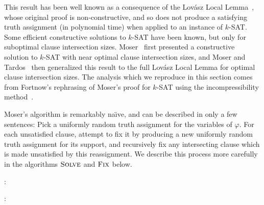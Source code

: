 \documentclass{patmorin}
\begin{document}
This result has been well known as a consequence of the Lov\'{a}sz
Local Lemma~\cite{lovasz:locallemma}, whose original proof is
non-constructive, and so does not produce a satisfying truth
assignment (in polynomial time) when applied to an instance of
$k$-SAT. Some efficient constructive solutions to $k$-SAT have been
known, but only for suboptimal clause intersection sizes.
Moser~\cite{moser:ksat} first presented a constructive solution to
$k$-SAT with near optimal clause intersection sizes, and Moser and
Tardos~\cite{moser:locallemma} then generalized this result to the
full Lov\'{a}sz Local Lemma for optimal clause intersection sizes. The
analysis which we reproduce in this section comes from Fortnow's
rephrasing of Moser's proof for $k$-SAT using the incompressibility
method~\cite{fortnow:ksat}.

Moser's algorithm is remarkably na\"\i ve, and can be described in only a
few sentences: Pick a uniformly random truth assignment for the
variables of $\varphi$. For each unsatisfied clause, attempt to fix it
by producing a new uniformly random truth assignment for its support,
and recursively fix any intersecting clause which is made unsatisfied
by this reassignment. We describe this process more carefully in the
algorithms $\textsc{Solve}$ and $\textsc{Fix}$ below.

:
\begin{algorithmic}[1]
  \ENDWHILE
  \RETURN{$\alpha$}
\end{algorithmic}

:
\begin{algorithmic}[1]
  \ENDWHILE
  \RETURN{$\alpha$}
\end{algorithmic}
\end{document}
